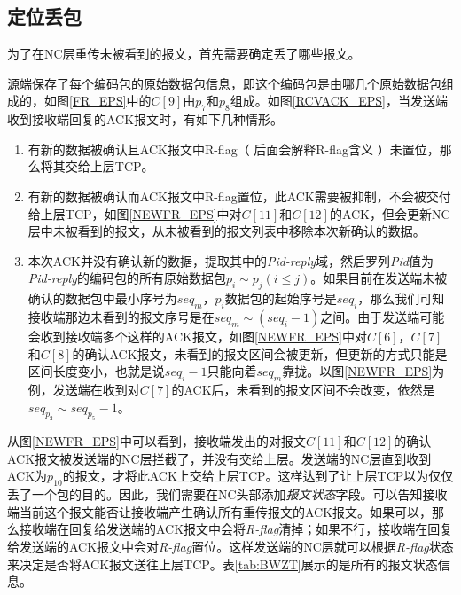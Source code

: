 \subsection{定位丢包}\label{DWDB}
为了在NC层重传未被看到的报文，首先需要确定丢了哪些报文。
\par
源端保存了每个编码包的原始数据包信息，即这个编码包是由哪几个原始数据包组成的，如图\ref{FR_EPS}中的$C\left[9\right]$由$p_7$和$p_8$组成。如图\ref{RCVACK_EPS}，当发送端收到接收端回复的ACK报文时，有如下几种情形。
\begin{enumerate}[fullwidth,itemindent=2em,label=(\arabic*)]
	\item 有新的数据被确认且ACK报文中R-flag（ 后面会解释R-flag含义 ）未置位，那么将其交给上层TCP。
	\item 有新的数据被确认而ACK报文中R-flag置位，此ACK需要被抑制，不会被交付给上层TCP，如图\ref{NEWFR_EPS}中对$C\left[11\right]$和$C\left[12\right]$的ACK，但会更新NC层中未被看到的报文，从未被看到的报文列表中移除本次新确认的数据。
	\item 本次ACK并没有确认新的数据，提取其中的\emph{Pid-reply}域，然后罗列\emph{Pid}值为\emph{Pid-reply}的编码包的所有原始数据包$p_i \sim p_j(i \le j)$。如果目前在发送端未被确认的数据包中最小序号为$seq_m$，$p_i$数据包的起始序号是$seq_i$，那么我们可知接收端那边未看到的报文序号是在$seq_m \sim \left(seq_i - 1\right)$之间。由于发送端可能会收到接收端多个这样的ACK报文，如图\ref{NEWFR_EPS}中对$C\left[6\right]$，$C\left[7\right]$和$C\left[8\right]$的确认ACK报文，未看到的报文区间会被更新，但更新的方式只能是区间长度变小，也就是说$seq_i-1$只能向着$seq_m$靠拢。以图\ref{NEWFR_EPS}为例，发送端在收到对$C\left[7\right]$的ACK后，未看到的报文区间不会改变，依然是$seq_{p_2} \sim seq_{p_5} - 1$。
\end{enumerate}
\par
从图\ref{NEWFR_EPS}中可以看到，接收端发出的对报文$C\left[11\right]$和$C\left[12\right]$的确认ACK报文被发送端的NC层拦截了，并没有交给上层。发送端的NC层直到收到ACK为$p_{10}$的报文，才将此ACK上交给上层TCP。这样达到了让上层TCP以为仅仅丢了一个包的目的。因此，我们需要在NC头部添加\emph{报文状态}字段。可以告知接收端当前这个报文能否让接收端产生确认所有重传报文的ACK报文。如果可以，那么接收端在回复给发送端的ACK报文中会将\emph{R-flag}清掉；如果不行，接收端在回复给发送端的ACK报文中会对\emph{R-flag}置位。这样发送端的NC层就可以根据\emph{R-flag}状态来决定是否将ACK报文送往上层TCP。表\ref{tab:BWZT}展示的是所有的报文状态信息。

